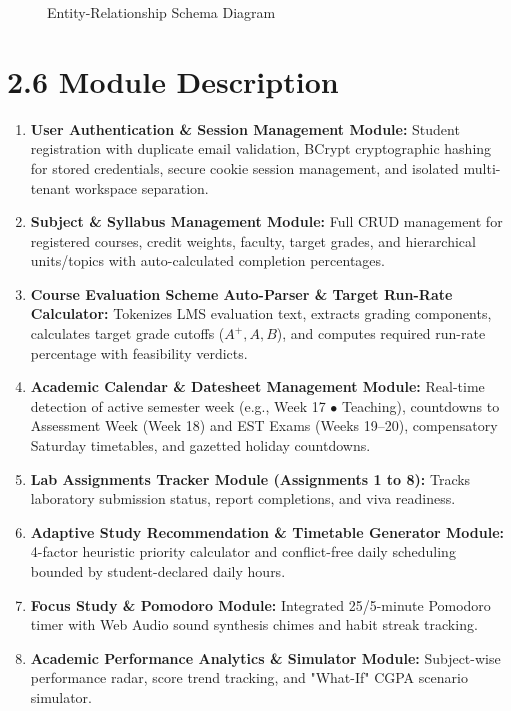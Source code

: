 \documentclass[12pt,a4paper]{report}
\begin{document}
\begin{figure}[h!]
\caption{Entity-Relationship Schema Diagram}
\end{figure}

\section{2.6 Module Description}
\begin{enumerate}
    \item \textbf{User Authentication \& Session Management Module:} Student registration with duplicate email validation, BCrypt cryptographic hashing for stored credentials, secure cookie session management, and isolated multi-tenant workspace separation.
    \item \textbf{Subject \& Syllabus Management Module:} Full CRUD management for registered courses, credit weights, faculty, target grades, and hierarchical units/topics with auto-calculated completion percentages.
    \item \textbf{Course Evaluation Scheme Auto-Parser \& Target Run-Rate Calculator:} Tokenizes LMS evaluation text, extracts grading components, calculates target grade cutoffs ($A^+, A, B$), and computes required run-rate percentage with feasibility verdicts.
    \item \textbf{Academic Calendar \& Datesheet Management Module:} Real-time detection of active semester week (e.g., Week 17 $\bullet$ Teaching), countdowns to Assessment Week (Week 18) and EST Exams (Weeks 19–20), compensatory Saturday timetables, and gazetted holiday countdowns.
    \item \textbf{Lab Assignments Tracker Module (Assignments 1 to 8):} Tracks laboratory submission status, report completions, and viva readiness.
    \item \textbf{Adaptive Study Recommendation \& Timetable Generator Module:} 4-factor heuristic priority calculator and conflict-free daily scheduling bounded by student-declared daily hours.
    \item \textbf{Focus Study \& Pomodoro Module:} Integrated 25/5-minute Pomodoro timer with Web Audio sound synthesis chimes and habit streak tracking.
    \item \textbf{Academic Performance Analytics \& Simulator Module:} Subject-wise performance radar, score trend tracking, and "What-If" CGPA scenario simulator.
\end{enumerate}
\end{document}
